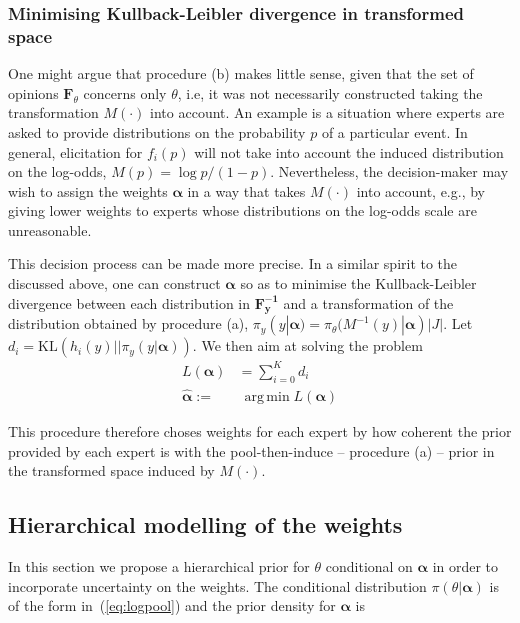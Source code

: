 \documentclass[a4paper, notitlepage, 10pt]{article}
\DeclareMathOperator*{\argmin}{arg\,min}
\begin{document}
\subsubsection*{Minimising Kullback-Leibler divergence in transformed space}

One might argue that procedure (b) makes little sense, given that the set of opinions $\mathbf{F}_{\theta}$ concerns only $\theta$, i.e, it was not necessarily constructed taking the transformation $M(\cdot)$ into account.
An example is a situation where experts are asked to provide distributions on the probability $p$ of a particular event.
In general, elicitation for $f_i(p)$ will not take into account the induced distribution on the log-odds, $M(p) = \log p/(1-p)$.
Nevertheless, the decision-maker may wish to assign the weights $\boldsymbol\alpha$ in a way that takes $M(\cdot)$ into account, e.g., by giving lower weights to experts whose distributions on the log-odds scale are unreasonable.

This decision process can be made more precise.
In a similar spirit to the discussed above, one can construct $\boldsymbol\alpha$ so as to minimise the Kullback-Leibler divergence between each distribution in $\mathbf{F^{-1}_y}$ and a transformation of the distribution obtained by procedure (a), $\pi_{y}(y | \boldsymbol\alpha) = \pi_{\theta}( M^{-1}(y)| \boldsymbol\alpha)|J|$.
Let $d_i = \text{KL}( h_i(y) || \pi_{y}(y | \boldsymbol\alpha))$.
We then aim at solving the problem
\begin{align}
L(\boldsymbol\alpha) &= \sum_{i=0}^Kd_i \\
     \hat{\boldsymbol\alpha}:=& \:\argmin L(\boldsymbol\alpha)  \nonumber
\end{align}

This procedure therefore choses weights for each expert by how coherent the prior provided by each expert is with the pool-then-induce -- procedure (a) -- prior in the transformed space induced by $M(\cdot)$.

\subsection*{Hierarchical modelling of the weights}
In this section we propose a hierarchical prior for $\theta$ conditional on $\boldsymbol\alpha$ in order to incorporate uncertainty on the weights.
The conditional distribution $\pi(\theta|\boldsymbol\alpha)$ is of the form in~(\ref{eq:logpool}) and the prior density for $\boldsymbol\alpha$ is 
\end{document}
